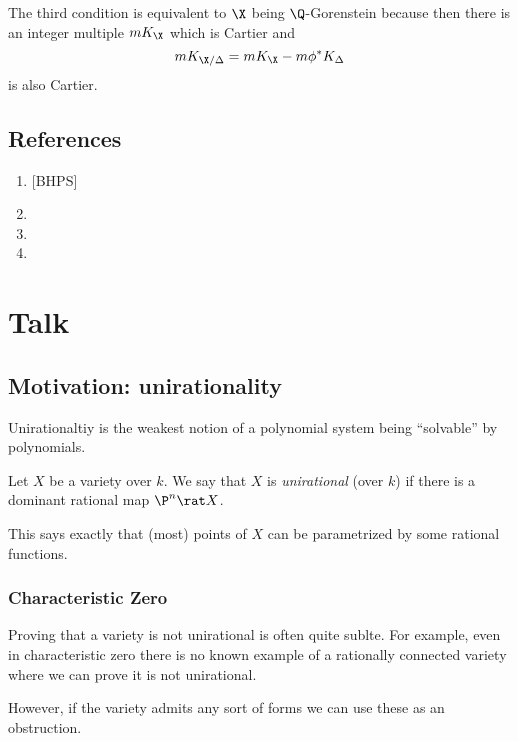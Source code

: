 \documentclass[12pt]{article}
\begin{document}
\begin{rmk}
The third condition is equivalent to $\X$ being $\Q$-Gorenstein because then there is an integer multiple $m K_{\X}$ which is Cartier and 
\[ m K_{\X / \Delta} = m K_{\X} - m \phi^* K_{\Delta} \]
is also Cartier. 
\end{rmk}


\subsection{References}

\begin{enumerate}
\item {}[BHPS]
\item {}
\item {}
\item {}
\end{enumerate}

\newpage

\section{Talk}

\subsection{Motivation: unirationality}

Unirationaltiy is the weakest notion of a polynomial system being ``solvable'' by polynomials. 

\begin{defn}
Let $X$ be a variety over $k$. We say that $X$ is \textit{unirational} (over $k$) if there is a dominant rational map $\P^n \rat X$.
\end{defn}

This says exactly that (most) points of $X$ can be parametrized by some rational functions. 

\subsubsection{Characteristic Zero}

Proving that a variety is not unirational is often quite sublte. For example, even in characteristic zero there is no known example of a rationally connected variety where we can prove it is not unirational.
\par 
However, if the variety admits any sort of forms we can use these as an obstruction.
\end{document}
